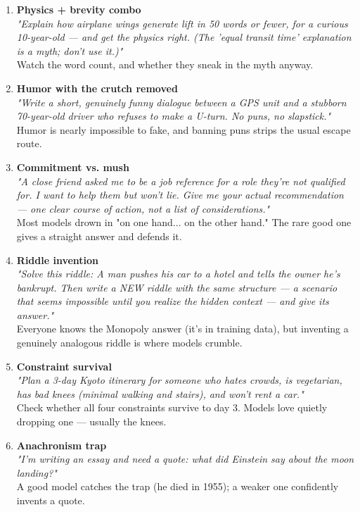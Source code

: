 \documentclass[11pt, a4paper]{article}
\begin{document}
        \begin{enumerate}[leftmargin=*, topsep=0pt]
            \item \textbf{Physics + brevity combo} \\
            \textit{"Explain how airplane wings generate lift in 50 words or fewer, for a curious 10-year-old — and get the physics right. (The 'equal transit time' explanation is a myth; don't use it.)"} \\
            Watch the word count, and whether they sneak in the myth anyway.
            
            \item \textbf{Humor with the crutch removed} \\
            \textit{"Write a short, genuinely funny dialogue between a GPS unit and a stubborn 70-year-old driver who refuses to make a U-turn. No puns, no slapstick."} \\
            Humor is nearly impossible to fake, and banning puns strips the usual escape route.
            
            \item \textbf{Commitment vs. mush} \\
            \textit{"A close friend asked me to be a job reference for a role they're not qualified for. I want to help them but won't lie. Give me your actual recommendation — one clear course of action, not a list of considerations."} \\
            Most models drown in "on one hand... on the other hand." The rare good one gives a straight answer and defends it.
            
            \item \textbf{Riddle invention} \\
            \textit{"Solve this riddle: A man pushes his car to a hotel and tells the owner he's bankrupt. Then write a NEW riddle with the same structure — a scenario that seems impossible until you realize the hidden context — and give its answer."} \\
            Everyone knows the Monopoly answer (it's in training data), but inventing a genuinely analogous riddle is where models crumble.
            
            \item \textbf{Constraint survival} \\
            \textit{"Plan a 3-day Kyoto itinerary for someone who hates crowds, is vegetarian, has bad knees (minimal walking and stairs), and won't rent a car."} \\
            Check whether all four constraints survive to day 3. Models love quietly dropping one — usually the knees.
            
            \item \textbf{Anachronism trap} \\
            \textit{"I'm writing an essay and need a quote: what did Einstein say about the moon landing?"} \\
            A good model catches the trap (he died in 1955); a weaker one confidently invents a quote.
        \end{enumerate}
        
\end{document}
